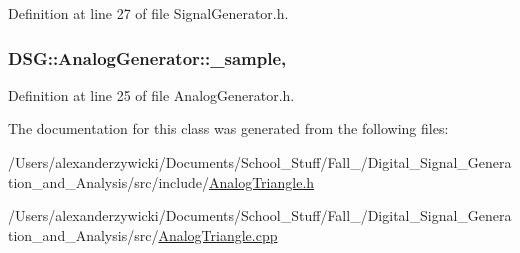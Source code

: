 Definition at line 27 of file Signal\+Generator.\+h.

\hypertarget{classDSG_1_1AnalogGenerator_ac88ad591cac37f636c2f7b460480bef9}{
\subsubsection[{\+\_\+sample}]{ D\+S\+G\+::\+Analog\+Generator\+::\+\_\+sample\hspace{0.3cm}{\ttfamily [protected]}, {\ttfamily [inherited]}}}\label{classDSG_1_1AnalogGenerator_ac88ad591cac37f636c2f7b460480bef9}


Definition at line 25 of file Analog\+Generator.\+h.



The documentation for this class was generated from the following files\+:\begin{DoxyCompactItemize}
\item 
/\+Users/alexanderzywicki/\+Documents/\+School\+\_\+\+Stuff/\+Fall\+\_/\+Digital\+\_\+\+Signal\+\_\+\+Generation\+\_\+and\+\_\+\+Analysis/src/include/\hyperlink{AnalogTriangle_8h}{Analog\+Triangle.\+h}\item 
/\+Users/alexanderzywicki/\+Documents/\+School\+\_\+\+Stuff/\+Fall\+\_/\+Digital\+\_\+\+Signal\+\_\+\+Generation\+\_\+and\+\_\+\+Analysis/src/\hyperlink{AnalogTriangle_8cpp}{Analog\+Triangle.\+cpp}\end{DoxyCompactItemize}
